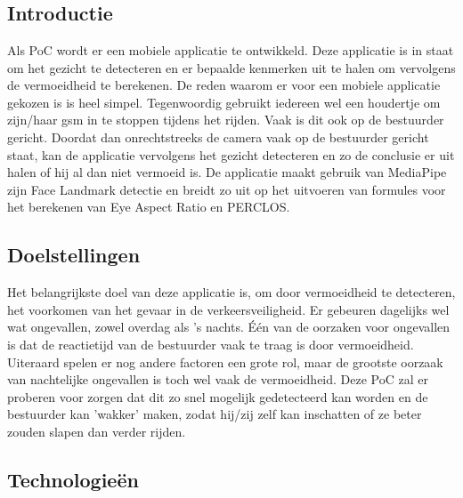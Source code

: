 \chapter{}%
\label{ch:proof-of-concept}

\section{Introductie}
Als PoC wordt er een mobiele applicatie te ontwikkeld. Deze applicatie is in staat om het gezicht te detecteren en er bepaalde kenmerken uit te halen om vervolgens de vermoeidheid te berekenen. De reden waarom er voor een mobiele applicatie gekozen is is heel simpel. Tegenwoordig gebruikt iedereen wel een houdertje om zijn/haar gsm in te stoppen tijdens het rijden. Vaak is dit ook op de bestuurder gericht. Doordat dan onrechtstreeks de camera vaak op de bestuurder gericht staat, kan de applicatie vervolgens het gezicht detecteren en zo de conclusie er uit halen of hij al dan niet vermoeid is. De applicatie maakt gebruik van MediaPipe zijn Face Landmark detectie en breidt zo uit op het uitvoeren van formules voor het berekenen van Eye Aspect Ratio en PERCLOS.

\section{Doelstellingen}
Het belangrijkste doel van deze applicatie is, om door vermoeidheid te detecteren, het voorkomen van het gevaar in de verkeersveiligheid. Er gebeuren dagelijks wel wat ongevallen, zowel overdag als 's nachts. Één van de oorzaken voor ongevallen is dat de reactietijd van de bestuurder vaak te traag is door vermoeidheid. Uiteraard spelen er nog andere factoren een grote rol, maar de grootste oorzaak van nachtelijke ongevallen is toch wel vaak de vermoeidheid. Deze PoC zal er proberen voor zorgen dat dit zo snel mogelijk gedetecteerd kan worden en de bestuurder kan 'wakker' maken, zodat hij/zij zelf kan inschatten of ze beter zouden slapen dan verder rijden.

\section{Technologieën}
